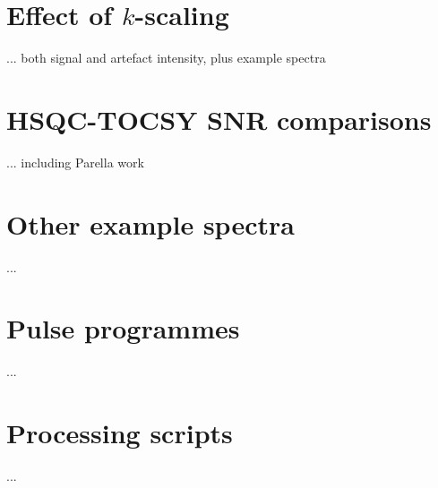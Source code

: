 \section{Effect of \texorpdfstring{$k$}{k}-scaling}

... both signal and artefact intensity, plus example spectra

\section{HSQC-TOCSY SNR comparisons}

... including Parella work

\section{Other example spectra}

...

\section{Pulse programmes}

...

\section{Processing scripts}

...
